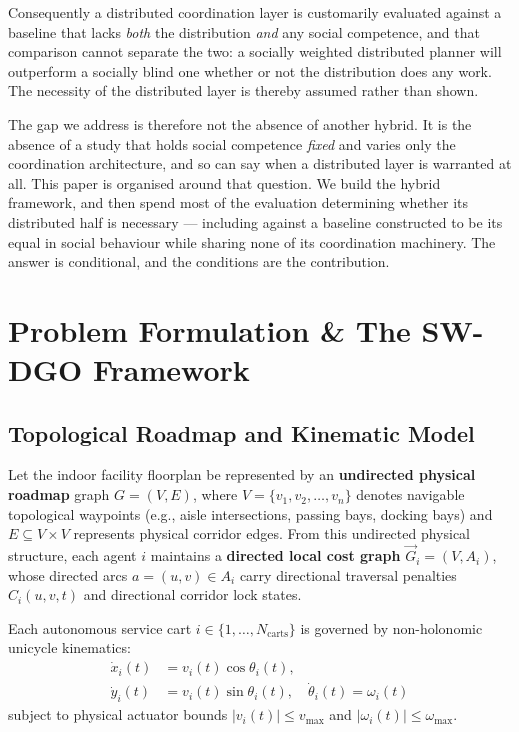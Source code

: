 \documentclass[journal]{IEEEtran}
\begin{document}
Consequently a distributed coordination layer is customarily evaluated against a baseline that lacks \emph{both} the distribution \emph{and} any social competence, and that comparison cannot separate the two: a socially weighted distributed planner will outperform a socially blind one whether or not the distribution does any work. The necessity of the distributed layer is thereby assumed rather than shown.

The gap we address is therefore not the absence of another hybrid. It is the absence of a study that holds social competence \emph{fixed} and varies only the coordination architecture, and so can say when a distributed layer is warranted at all. This paper is organised around that question. We build the hybrid framework, and then spend most of the evaluation determining whether its distributed half is necessary --- including against a baseline constructed to be its equal in social behaviour while sharing none of its coordination machinery. The answer is conditional, and the conditions are the contribution.


\section{Problem Formulation \& The SW-DGO Framework}

\subsection{Topological Roadmap and Kinematic Model}
Let the indoor facility floorplan be represented by an \textbf{undirected physical roadmap} graph $G = (V, E)$, where $V = \{v_1, v_2, \dots, v_n\}$ denotes navigable topological waypoints (e.g., aisle intersections, passing bays, docking bays) and $E \subseteq V \times V$ represents physical corridor edges. From this undirected physical structure, each agent $i$ maintains a \textbf{directed local cost graph} $\vec{G}_i = (V, A_i)$, whose directed arcs $a = (u,v) \in A_i$ carry directional traversal penalties $C_i(u,v,t)$ and directional corridor lock states.

Each autonomous service cart $i \in \{1, \dots, N_{\text{carts}}\}$ is governed by non-holonomic unicycle kinematics:
\begin{align}
\dot{x}_i(t) &= v_i(t) \cos \theta_i(t), \nonumber \\
\dot{y}_i(t) &= v_i(t) \sin \theta_i(t), \quad \dot{\theta}_i(t) = \omega_i(t)
\end{align}
subject to physical actuator bounds $|v_i(t)| \le v_{\max}$ and $|\omega_i(t)| \le \omega_{\max}$.
\end{document}
